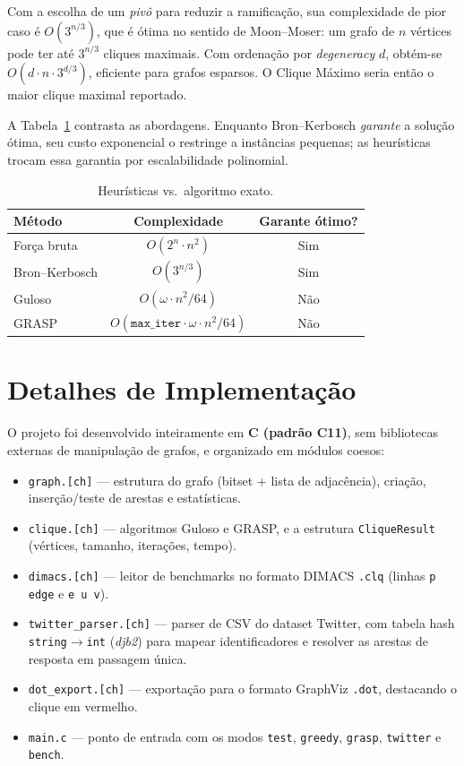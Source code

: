 \documentclass[12pt]{article}
\begin{document}
Com a escolha de um \emph{pivô} para reduzir a ramificação, sua complexidade de
pior caso é $O(3^{n/3})$, que é ótima no sentido de Moon--Moser: um grafo de
$n$ vértices pode ter até $3^{n/3}$ cliques maximais. Com ordenação por
\emph{degeneracy} $d$, obtém-se $O(d \cdot n \cdot 3^{d/3})$, eficiente para
grafos esparsos. O Clique Máximo seria então o maior clique maximal reportado.

A Tabela~\ref{tab:exato} contrasta as abordagens. Enquanto Bron--Kerbosch
\emph{garante} a solução ótima, seu custo exponencial o restringe a instâncias
pequenas; as heurísticas trocam essa garantia por escalabilidade polinomial.

\begin{table}[ht]
\centering
\caption{Heurísticas vs.\ algoritmo exato.}
\label{tab:exato}
\begin{tabular}{l c c}
\hline
\textbf{Método} & \textbf{Complexidade} & \textbf{Garante ótimo?} \\
\hline
Força bruta        & $O(2^n \cdot n^2)$        & Sim \\
Bron--Kerbosch     & $O(3^{n/3})$             & Sim \\
Guloso             & $O(\omega \cdot n^2/64)$ & Não \\
GRASP              & $O(\texttt{max\_iter}\cdot\omega\cdot n^2/64)$ & Não \\
\hline
\end{tabular}
\end{table}

\section{Detalhes de Implementação}
\label{sec:impl}

O projeto foi desenvolvido inteiramente em \textbf{C (padrão C11)}, sem
bibliotecas externas de manipulação de grafos, e organizado em módulos coesos:

\begin{itemize}
  \item \texttt{graph.[ch]} --- estrutura do grafo (bitset + lista de
  adjacência), criação, inserção/teste de arestas e estatísticas.
  \item \texttt{clique.[ch]} --- algoritmos Guloso e GRASP, e a estrutura
  \texttt{CliqueResult} (vértices, tamanho, iterações, tempo).
  \item \texttt{dimacs.[ch]} --- leitor de benchmarks no formato DIMACS
  \texttt{.clq} (linhas \texttt{p edge} e \texttt{e u v}).
  \item \texttt{twitter\_parser.[ch]} --- parser de CSV do dataset Twitter, com
  tabela hash \texttt{string}$\rightarrow$\texttt{int} (\emph{djb2}) para mapear
  identificadores e resolver as arestas de resposta em passagem única.
  \item \texttt{dot\_export.[ch]} --- exportação para o formato GraphViz
  \texttt{.dot}, destacando o clique em vermelho.
  \item \texttt{main.c} --- ponto de entrada com os modos \texttt{test},
  \texttt{greedy}, \texttt{grasp}, \texttt{twitter} e \texttt{bench}.
\end{itemize}
\end{document}
